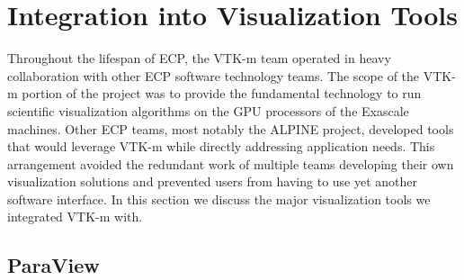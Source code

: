 \section{Integration into Visualization Tools}

Throughout the lifespan of ECP, the VTK-m team operated in heavy collaboration with other ECP software technology teams.
The scope of the VTK-m portion of the project was to provide the fundamental technology to run scientific visualization algorithms on the GPU processors of the Exascale machines.
Other ECP teams, most notably the ALPINE project, developed tools that would leverage VTK-m while directly addressing application needs.
This arrangement avoided the redundant work of multiple teams developing their own visualization solutions and prevented users from having to use yet another software interface.
In this section we discuss the major visualization tools we integrated VTK-m with.


\subsection{ParaView}


